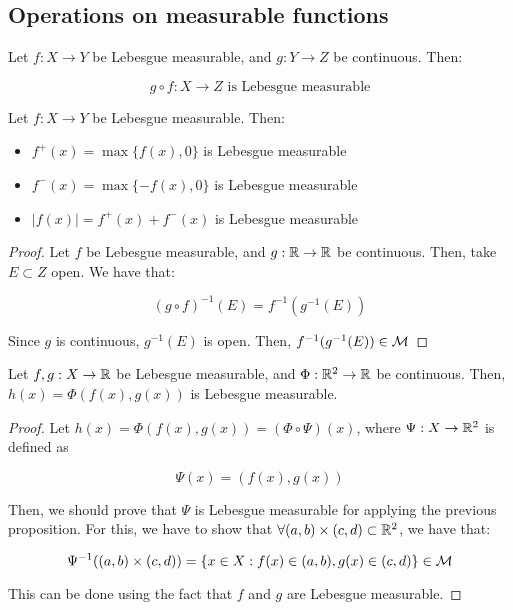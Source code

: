 \subsection{Operations on measurable functions}

\begin{fproposition}
    Let $f: X \to Y$ be Lebesgue measurable, and $g: Y \to Z$ be continuous. Then:

    $$g \circ f: X \to Z \text{ is Lebesgue measurable}$$
\end{fproposition}

\begin{fcorollary}
    Let $f: X \to Y$ be Lebesgue measurable. Then:
    \vspace{1em}
    \begin{itemize}
        \item $f^+(x) = \max\{f(x), 0\}$ is Lebesgue measurable
        \vspace{1em}
        \item $f^-(x) = \max\{-f(x), 0\}$ is Lebesgue measurable
        \vspace{1em}
        \item $|f(x)| = f^+(x) + f^-(x)$ is Lebesgue measurable
    \end{itemize}

\end{fcorollary}

\begin{proof}
    Let $f$ be Lebesgue measurable, and $g: \mathbb{R} \to \mathbb{R}$ be continuous. Then, take
    $E \subset Z$ open. We have that:

    $$(g \circ f)^{-1}(E) = f^{-1}(g^{-1}(E))$$

    Since $g$ is continuous, $g^{-1}(E)$ is open. Then, $f^{-1}(g^{-1}(E)) \in \mathcal{M}$
\end{proof}

\begin{fproposition}
    Let $f, g: X \to \mathbb{R}$ be Lebesgue measurable, and $\Phi: \mathbb{R}^2 \to \mathbb{R}$ be continuous.
    Then, $h(x) = \Phi(f(x), g(x))$ is Lebesgue measurable. 
\end{fproposition}

\begin{proof}
    Let $h(x) = \Phi(f(x), g(x)) = (\Phi \circ \Psi)(x)$, where $\Psi: X \to \mathbb{R}^2$ is defined as

    $$\Psi(x) = (f(x), g(x))$$

    Then, we should prove that $\Psi$ is Lebesgue measurable for applying the previous proposition.
    For this, we have to show that $\forall (a, b) \times (c, d) \subset \mathbb{R}^2$, we have that:

    $$\Psi^{-1}((a, b) \times (c, d)) = \{x \in X: f(x) \in (a, b), g(x) \in (c, d)\} \in \mathcal{M}$$

    This can be done using the fact that $f$ and $g$ are Lebesgue measurable.

\end{proof}

